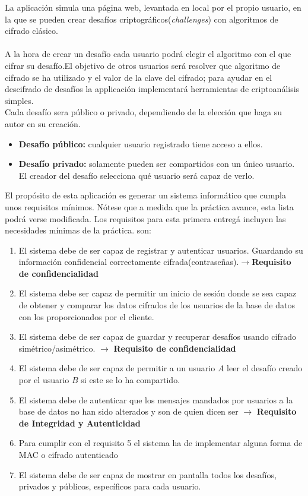 \documentclass[a4paper,11pt]{article}
\begin{document}
La aplicación simula una página web, levantada en local por el propio usuario,
en la que se pueden crear desafíos criptográficos(\textit{challenges}) con algoritmos de cifrado
clásico.\\\\
A la hora de crear un desafío cada usuario podrá elegir el algoritmo con el que
cifrar su desafío.El objetivo de otros usuarios será resolver que algoritmo de
cifrado se ha utilizado y el valor de la clave del cifrado; para ayudar en el
descifrado de desafíos la applicación implementará herramientas de
criptoanálisis simples.\\
Cada desafío sera público o privado, dependiendo de la elección que haga su
autor en su creación.
\begin{itemize}
    \item \textbf{Desafío público:} cualquier usuario registrado tiene acceso a ellos.
    \item \textbf{Desafío privado:} solamente pueden ser compartidos con un
        único usuario. El creador del desafío selecciona qué usuario será capaz de verlo.
\end{itemize}

El propósito de esta aplicación es generar un sistema informático que cumpla
unos requisitos mínimos. Nótese que a medida que la práctica avance, esta lista
podrá verse modificada. Los requisitos para esta primera entregá incluyen las
necesidades mínimas de la práctica.
son:\begin{enumerate}
    \item El sistema debe de ser capaz de registrar y autenticar usuarios.
        Guardando su información confidencial correctamente cifrada(contraseñas).$\rightarrow$\textbf{Requisito de confidencialidad}
    \item El sistema debe ser capaz de permitir un inicio de sesión donde se sea capaz de obtener y comparar 
        los datos cifrados de los usuarios de la base de datos con los proporcionados por el cliente.
    \item El sistema debe de ser capaz de guardar y recuperar desafíos usando
        cifrado simétrico/asimétrico. 
        $\rightarrow$ \textbf{Requisito de confidencialidad}
    \item El sistema debe de ser capaz de permitir a un usuario $A$ leer el desafío creado por el usuario $B$ si este se lo ha compartido.
    \item El sistema debe de autenticar que los mensajes mandados por usuarios a la
        base de datos no han sido alterados y son de quien dicen ser $\rightarrow$ \textbf{Requisito de Integridad y
        Autenticidad}
    \item Para cumplir con el requisito 5 el sistema ha de implementar alguna
        forma de MAC o cifrado autenticado
    \item El sistema debe de ser capaz de mostrar en pantalla todos los
        desafíos, privados y públicos, específicos para cada usuario.
\end{enumerate}
\end{document}
